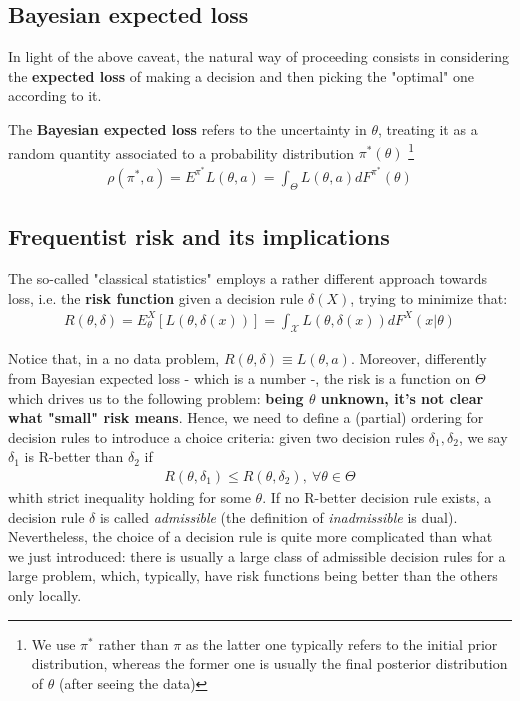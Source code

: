 \documentclass{article}
\newcommand{\loss}{L(\theta, a)}
\newcommand{\lossRule}{L(\theta, \delta(x))}
\newcommand{\risk}{R(\theta, \delta)}
\begin{document}
	\subsection{Bayesian expected loss}
	In light of the above caveat, the natural way of proceeding consists in considering the \textbf{expected loss} of making a decision and then picking the "optimal" one according to it.

	The \textbf{Bayesian expected loss} refers to the uncertainty in $\theta$, treating it as a random quantity associated to a probability distribution $\pi^*(\theta)$ \footnote{We use $\pi^*$ rather than $\pi$ as the latter one typically refers to the initial prior distribution, whereas the former one is usually the final posterior distribution of $\theta$ (after seeing the data)} 
	\begin{align*}
		\rho(\pi^*, a) = E^{\pi^*} \loss = \int_{\Theta} \loss dF^{\pi^*}(\theta)
	\end{align*}
    
	\subsection{Frequentist risk and its implications}
	The so-called "classical statistics" employs a rather different approach towards loss, i.e. the \textbf{risk function} given a decision rule $\delta(X)$, trying to minimize that:
	\begin{align*}
		\risk = E_{\theta}^{X}[\lossRule] = \int_{\mathcal{X}} \lossRule dF^X (x | \theta) 
	\end{align*}

	Notice that, in a no data problem, $\risk \equiv \loss$. Moreover, differently from Bayesian expected loss - which is a number -, the risk is a function on $\Theta$ which drives us to the following problem: \textbf{being $\theta$ unknown, it's not clear what "small" risk means}. Hence, we need to define a (partial) ordering for decision rules to introduce a choice criteria: given two decision rules $\delta_1, \delta_2$, we say $\delta_1$ is R-better than $\delta_2$ if 
	\begin{align*}
		R(\theta, \delta_1) \leq R(\theta, \delta_2), \ \forall \theta \in \Theta
	\end{align*}
	 whith strict inequality holding for some $\theta$. If no R-better decision rule exists, a decision rule $\delta$ is called \textit{admissible} (the definition of \textit{inadmissible} is dual). Nevertheless, the choice of a decision rule is quite more complicated than what we just introduced: there is usually a large class of admissible decision rules for a large problem, which,
	typically, have risk functions being better than the others only locally.
	
\end{document}
